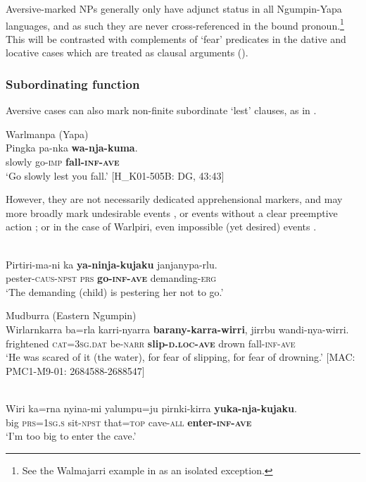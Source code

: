 \documentclass[output=paper,colorlinks,citecolor=brown]{langscibook}
\begin{document}
 Aversive-marked NPs generally only have adjunct status in all Ngumpin-Yapa languages, and as such they are never cross-referenced in the bound pronoun.\footnote{See the Walmajarri example in  as an isolated exception.} This will be contrasted with complements of `fear' predicates in the dative and locative cases which are treated as clausal arguments ().

\subsubsection{Subordinating function}
\label{subsubsec:subordinating}

Aversive cases can also mark non-finite subordinate `lest' clauses, as in .

\ea 
\textnormal{Warlmanpa (Yapa)} \\
\gll Pingka pa-nka \textbf{wa-nja-kuma}. \\
slowly go-\textsc{imp} \textbf{fall-\textsc{inf-ave}} \\
\glt `Go slowly lest you fall.' $[$H\_K01-505B: DG, 43:43$]$
\label{ex:bro22}
\z

However, they are not necessarily dedicated apprehensional markers, and may more broadly mark undesirable events , or events without a clear preemptive action ; or in the case of Warlpiri, even impossible (yet desired) events .


\ea
{} {\citealt[53]{laughren_expressing_2015}} \\
\gll Pirtiri-ma-ni ka \textbf{ya-ninja-kujaku} janjanypa-rlu. \\
pester-\textsc{caus-npst} \textsc{prs} \textbf{go-\textsc{inf-ave}} demanding-\textsc{erg} \\
\glt `The demanding (child) is pestering her not to go.'
\label{ex:bro23}
\z

\ea 
\textnormal{Mudburra (Eastern Ngumpin)} \\
\gll Wirlarnkarra ba=rla karri-nyarra \textbf{barany-karra-wirri}, jirrbu wandi-nya-wirri. \\
frightened \textsc{cat=3sg.dat} be-\textsc{narr} \textbf{slip-\textsc{d.loc-ave}} drown fall-\textsc{inf-ave} \\
\glt `He was scared of it (the water), for fear of slipping, for fear of drowning.' $[$MAC: PMC1-M9-01: 2684588-2688547$]$
\label{ex:bro24}
\z

\ea
{} {\citealt[6]{laughren_expressing_2015}} \\
\gll Wiri ka=rna nyina-mi yalumpu=ju pirnki-kirra \textbf{yuka-nja-kujaku}. \\
big \textsc{prs=1sg.s} sit-\textsc{npst} that=\textsc{top} cave-\textsc{all} \textbf{enter-\textsc{inf-ave}} \\
\glt `I'm too big to enter the cave.'
\label{ex:bro25}
\z
\end{document}
